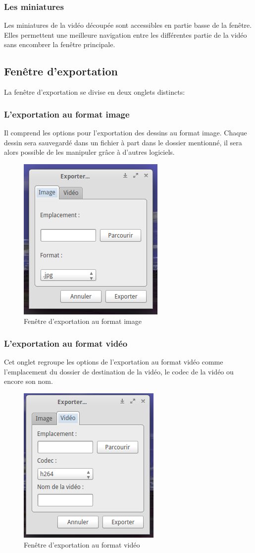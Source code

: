	\subsubsection{Les miniatures}
		Les miniatures de la vidéo découpée sont accessibles en partie basse de la fenêtre. Elles permettent une meilleure navigation entre les différentes partie de la vidéo sans encombrer la fenêtre principale.

\subsection{Fenêtre d'exportation}
	La fenêtre d'exportation se divise en deux onglets distincts:
	\subsubsection*{L'exportation au format image}
		Il comprend les options pour l'exportation des dessins au format image. Chaque dessin sera sauvegardé dans un fichier à part dans le dossier mentionné, il sera alors possible de les manipuler grâce à d'autres logiciels.
		
		\begin{figure}[h]
			\centering
			\includegraphics[scale=0.65]{./figures/img.png}
			\caption{Fenêtre d'exportation au format image}
		\end{figure}
	
	\subsubsection*{L'exportation au format vidéo}
		Cet onglet regroupe les options de l'exportation au format vidéo comme l'emplacement du dossier de destination de la vidéo, le codec de la vidéo ou encore son nom.

		\begin{figure}[h]
			\centering
			\includegraphics[scale=0.65]{./figures/vid.png}
			\caption{Fenêtre d'exportation au format vidéo}
		\end{figure}
